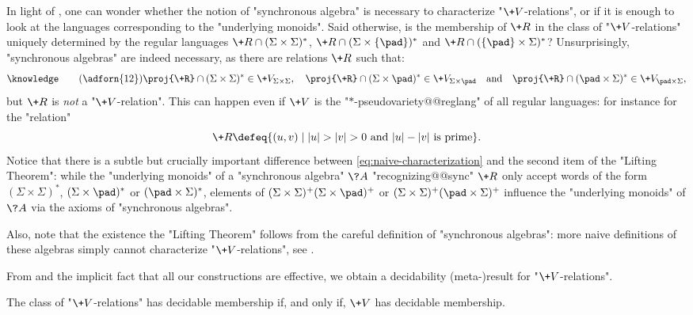 \begin{remark}
	In light of ,
	one can wonder whether the notion of "synchronous algebra" is necessary to
	characterize "$\+V$-relations", or if it is enough to look at the languages corresponding to
	the "underlying monoids".
	Said otherwise, is the membership of $\+R$ in the class of "$\+V$-relations" uniquely
	determined by the regular languages $\+R \cap (\Sigma\times\Sigma)^*$,
	$\+R \cap (\Sigma\times\{\pad\})^*$ and $\+R \cap (\{\pad\}\times\Sigma)^*$?
	Unsurprisingly, "synchronous algebras" are indeed necessary, as 
	there are relations $\+R$ such that:
	\begin{equation}
		\AP\label{eq:naive-characterization} \tag{\adforn{12}}
		\proj{\+R} \cap (\Sigma\times \Sigma)^* \in \+V_{\Sigma\times \Sigma}, \quad
		\proj{\+R} \cap (\Sigma\times \pad)^* \in \+V_{\Sigma\times \pad}\quad\text{and}\quad
		\proj{\+R} \cap (\pad\times \Sigma)^* \in \+V_{\pad\times \Sigma},
	\end{equation}
	but $\+R$ is \emph{not} a "$\+V$-relation". This can happen even if
	$\+V$ is the "$\ast$-pseudovariety@@reglang" of all regular languages: for instance for the
	"relation"
	\[
		\+R \defeq \{(u,v) \mid |u| > |v| > 0 \text{ and } |u| - |v| \text{ is prime}\}.
	\]
	Notice that there is a subtle but crucially important difference between
	\eqref{eq:naive-characterization} and the second item of the "Lifting Theorem":
	while the "underlying monoids" of a "synchronous algebra" $\?A$ "recognizing@@sync" $\+R$
	only accept words of the form $(\Sigma\times \Sigma)^*$, $(\Sigma\times \pad)^*$
	or $(\pad\times \Sigma)^*$, elements of $(\Sigma\times \Sigma)^+(\Sigma\times \pad)^+$
	or $(\Sigma\times \Sigma)^+(\pad\times \Sigma)^+$ influence the "underlying monoids" of $\?A$
	via the axioms of "synchronous algebras".
\end{remark}

Also, note that the existence the "Lifting Theorem" follows from the careful
definition of "synchronous algebras": more naive definitions of these algebras
simply cannot characterize "$\+V$-relations", see .

From 
and the implicit fact that all our constructions are effective,
we obtain a decidability (meta-)result for
"$\+V$-relations".
\begin{corollary}
	\AP\label{coro:decidability}
	The class of "$\+V$-relations" has decidable membership if, and only if, $\+V$ has decidable membership.
\end{corollary}


